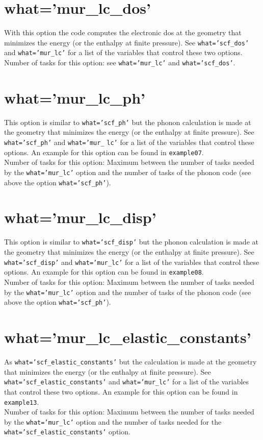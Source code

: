 \documentclass[12pt,a4paper,twoside]{report}
\begin{document}
\newpage
{\color{coral}\section{what='mur\_lc\_dos'}}
\color{black}
With this option the code computes the electronic dos at the geometry 
that minimizes the energy (or the enthalpy at finite pressure). See  
\texttt{what='scf\_dos'} and \texttt{what='mur\_lc'} for a list of 
the variables that control these two options.\\
Number of tasks for this option: see \texttt{what='mur\_lc'} and 
\texttt{what='scf\_dos'}.

\newpage
{\color{coral}\section{what='mur\_lc\_ph'}}
\color{black}
This option is similar to \texttt{what='scf\_ph'} but the phonon calculation
is made at the geometry that minimizes the energy (or the enthalpy
at finite pressure).
See \texttt{what='scf\_ph'} and \texttt{what='mur\_} \texttt{lc'} for a
list of the variables that control these options. 
An example for this option can be found in \texttt{example07}. \\
Number of tasks for this option: Maximum between the number of tasks 
needed by the \texttt{what='mur\_lc'} option and the number
of tasks of the phonon code (see above the option \texttt{what='scf\_ph'}).

\newpage
{\color{coral}\section{what='mur\_lc\_disp'}}
\color{black}
This option is similar to \texttt{what='scf\_disp'} but the phonon calculation
is made at the geometry that minimizes the energy (or the enthalpy
at finite pressure).
See \texttt{what='scf\_disp'} and \texttt{what='mur\_lc'} for a
list of the variables that control these options. 
An example for this option can be found in \texttt{example08}. \\
Number of tasks for this option: Maximum between the number of tasks  
needed by the \texttt{what='mur\_lc'} option and the number
of tasks of the phonon code (see above the option \texttt{what='scf\_ph'}).

\newpage
{\color{coral}\section{what='mur\_lc\_elastic\_constants'}}
\color{black}
As \texttt{what='scf\_elastic\_constants'} but the calculation is made at the
geometry that minimizes the energy (or the enthalpy at finite pressure). 
See \texttt{what='scf\_elastic\_constants'} and \texttt{what='mur\_lc'} for 
a list of the variables that control these two options.
An example for this option can be found in \texttt{example13}. \\
Number of tasks for this option: Maximum between the number of tasks
needed by the \texttt{what='mur\_lc'} option and the number of tasks
needed for the \texttt{what='scf\_elastic\_constants'} option.
\end{document}
